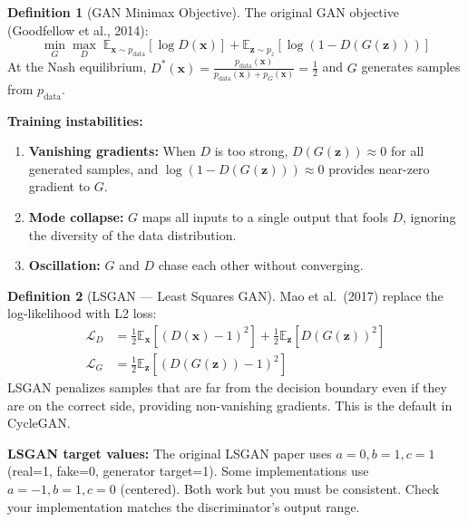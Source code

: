 \documentclass[11pt,a4paper]{article}
\theoremstyle{definition}
\newtheorem{definition}{Definition}[section]
\begin{document}
\begin{definition}[GAN Minimax Objective]
The original GAN objective (Goodfellow et al., 2014):
\begin{equation}
    \min_G \max_D \; \mathbb{E}_{\bm{x} \sim p_{\text{data}}}[\log D(\bm{x})] + \mathbb{E}_{\bm{z} \sim p_z}[\log(1 - D(G(\bm{z})))]
\end{equation}
At the Nash equilibrium, $D^*(\bm{x}) = \frac{p_{\text{data}}(\bm{x})}{p_{\text{data}}(\bm{x}) + p_G(\bm{x})} = \frac{1}{2}$ and $G$ generates samples from $p_{\text{data}}$.
\end{definition}

\textbf{Training instabilities:}
\begin{enumerate}
    \item \textbf{Vanishing gradients:} When $D$ is too strong, $D(G(\bm{z})) \approx 0$ for all generated samples, and $\log(1 - D(G(\bm{z}))) \approx 0$ provides near-zero gradient to $G$.
    \item \textbf{Mode collapse:} $G$ maps all inputs to a single output that fools $D$, ignoring the diversity of the data distribution.
    \item \textbf{Oscillation:} $G$ and $D$ chase each other without converging.
\end{enumerate}

\begin{definition}[LSGAN --- Least Squares GAN]
Mao et al.\ (2017) replace the log-likelihood with L2 loss:
\begin{align}
    \mathcal{L}_D &= \frac{1}{2}\mathbb{E}_{\bm{x}}[(D(\bm{x}) - 1)^2] + \frac{1}{2}\mathbb{E}_{\bm{z}}[D(G(\bm{z}))^2] \\
    \mathcal{L}_G &= \frac{1}{2}\mathbb{E}_{\bm{z}}[(D(G(\bm{z})) - 1)^2]
\end{align}
LSGAN penalizes samples that are far from the decision boundary even if they are on the correct side, providing non-vanishing gradients. This is the default in CycleGAN.
\end{definition}

\begin{edgecase}
\textbf{LSGAN target values:} The original LSGAN paper uses $a=0, b=1, c=1$ (real=1, fake=0, generator target=1). Some implementations use $a=-1, b=1, c=0$ (centered). Both work but you must be consistent. Check your implementation matches the discriminator's output range.
\end{edgecase}

\end{document}
